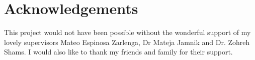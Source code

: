 \documentclass[12pt,a4paper,twoside]{report}
\newif\ifsubmission %
\begin{document}


\ifsubmission\else

\chapter*{Acknowledgements}

This project would not have been possible without the wonderful
support of my lovely supervisors Mateo Espinosa Zarlenga, Dr Mateja Jamnik and Dr. Zohreh Shams. I would also like to 
thank my friends and family for their support.

\fi
\cleardoublepage %

\tableofcontents
\listoffigures
\listoftables



\pagestyle{headings}
\label{lastcontentpage}







\label{lastpage}

\end{document}
